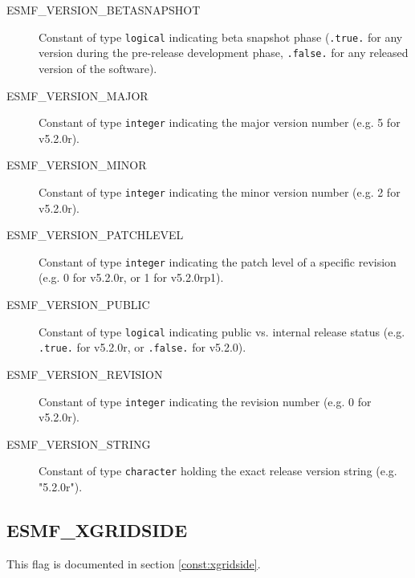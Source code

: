 \begin{description}
\item [ESMF\_VERSION\_BETASNAPSHOT]
      Constant of type {\tt logical} indicating beta snapshot phase
      ({\tt .true.} for any version during the pre-release development phase,
      {\tt .false.} for any released version of the software).
\item [ESMF\_VERSION\_MAJOR]
      Constant of type {\tt integer} indicating the major version number
      (e.g. 5 for v5.2.0r).
\item [ESMF\_VERSION\_MINOR]
      Constant of type {\tt integer} indicating the minor version number
      (e.g. 2 for v5.2.0r).
\item [ESMF\_VERSION\_PATCHLEVEL]
      Constant of type {\tt integer} indicating the patch level of a specific
      revision (e.g. 0 for v5.2.0r, or 1 for v5.2.0rp1).
\item [ESMF\_VERSION\_PUBLIC]
      Constant of type {\tt logical} indicating public vs. internal release
      status (e.g. {\tt .true.} for v5.2.0r, or {\tt .false.} for v5.2.0).
\item [ESMF\_VERSION\_REVISION]
      Constant of type {\tt integer} indicating the revision number
      (e.g. 0 for v5.2.0r).
\item [ESMF\_VERSION\_STRING]
      Constant of type {\tt character} holding the exact release version string
      (e.g. "5.2.0r").
\end{description}

\subsection{ESMF\_XGRIDSIDE}
This flag is documented in section \ref{const:xgridside}.

